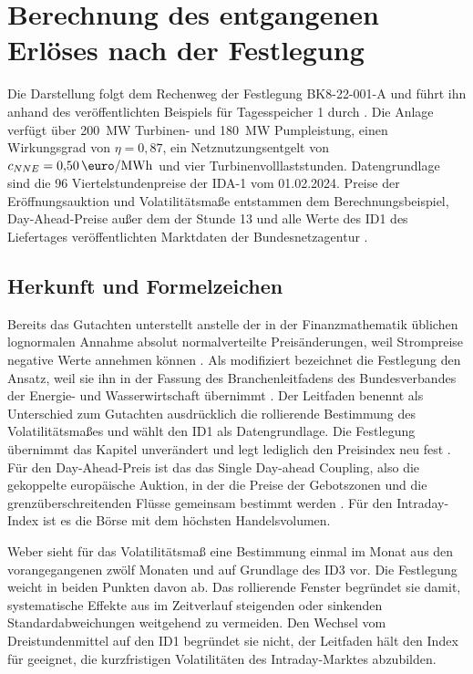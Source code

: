\chapter{Berechnung des entgangenen Erlöses nach der Festlegung}
\label{anh:weber}

Die Darstellung folgt dem Rechenweg der Festlegung BK8-22-001-A und führt ihn anhand des veröffentlichten Beispiels für Tagesspeicher 1 durch \cite{bundesnetzagentur_berechnungsbeispiel_2024}. Die Anlage verfügt über \SI{200}{\mega\watt} Turbinen- und \SI{180}{\mega\watt} Pumpleistung, einen Wirkungsgrad von $\eta = 0{,}87$, ein Netznutzungsentgelt von $c_{NNE} = 0{,}50\,\si{\text{\euro}\per MWh}$ und vier Turbinenvolllaststunden. Datengrundlage sind die 96 Viertelstundenpreise der \ac{IDA-1} vom 01.02.2024. Preise der Eröffnungsauktion und Volatilitätsmaße entstammen dem Berechnungsbeispiel, Day-Ahead-Preise außer dem der Stunde 13 und alle Werte des \ac{ID1} des Liefertages veröffentlichten Marktdaten der Bundesnetzagentur \cite{bundesnetzagentur_berechnungsbeispiel_2024, smard_marktdaten_2026}.

\section{Herkunft und Formelzeichen}
\label{anh:weber:herkunft}

Bereits das Gutachten unterstellt anstelle der in der Finanzmathematik üblichen lognormalen Annahme absolut normalverteilte Preisänderungen, weil Strompreise negative Werte annehmen können \cite{weber_gutachten_2015}.
Als modifiziert bezeichnet die Festlegung den Ansatz, weil sie ihn in der Fassung des Branchenleitfadens des Bundesverbandes der Energie- und Wasserwirtschaft übernimmt \cite{bdew_branchenleitfaden_2018}.
Der Leitfaden benennt als Unterschied zum Gutachten ausdrücklich die rollierende Bestimmung des Volatilitätsmaßes und wählt den \ac{ID1} als Datengrundlage.
Die Festlegung übernimmt das Kapitel unverändert und legt lediglich den Preisindex neu fest \cite{bundesnetzagentur_anlage1_2024}.
Für den Day-Ahead-Preis ist das das Single Day-ahead Coupling, also die gekoppelte europäische Auktion, in der die Preise der Gebotszonen und die grenzüberschreitenden Flüsse gemeinsam bestimmt werden \cite{europaische_kommission_verordnung_2015}.
Für den Intraday-Index ist es die Börse mit dem höchsten Handelsvolumen.

Weber sieht für das Volatilitätsmaß eine Bestimmung einmal im Monat aus den vorangegangenen zwölf Monaten und auf Grundlage des \ac{ID3} vor.
Die Festlegung weicht in beiden Punkten davon ab.
Das rollierende Fenster begründet sie damit, systematische Effekte aus im Zeitverlauf steigenden oder sinkenden Standardabweichungen weitgehend zu vermeiden.
Den Wechsel vom Dreistundenmittel auf den \ac{ID1} begründet sie nicht, der Leitfaden hält den Index für geeignet, die kurzfristigen Volatilitäten des Intraday-Marktes abzubilden.

